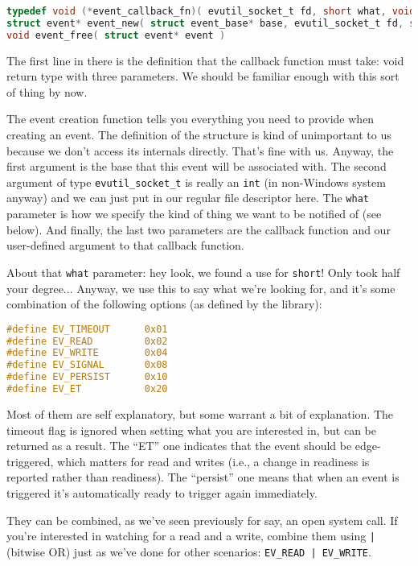 \begin{lstlisting}[language=C]
typedef void (*event_callback_fn)( evutil_socket_t fd, short what, void* arg )
struct event* event_new( struct event_base* base, evutil_socket_t fd, short what, event_callback_fn cb, void* arg )
void event_free( struct event* event )
\end{lstlisting}

The first line in there is the definition that the callback function must take: void return type with three parameters. We should be familiar enough with this sort of thing by now.

The event creation function tells you everything you need to provide when creating an event. The definition of the structure is kind of unimportant to us because we don't access its internals directly. That's fine with us. Anyway, the first argument is the base that this event will be associated with. The second argument of type \texttt{evutil\_socket\_t} is really an \texttt{int} (in non-Windows system anyway) and we can just put in our regular file descriptor here. The \texttt{what} parameter is how we specify the kind of thing we want to be notified of (see below). And finally, the last two parameters are the callback function and our user-defined argument to that callback function.

About that \texttt{what} parameter: hey look, we found a use for \texttt{short}! Only took half your degree... Anyway, we use this to say what we're looking for, and it's some combination of the following options (as defined by the library):

\begin{lstlisting}[language=C]
#define EV_TIMEOUT      0x01
#define EV_READ         0x02
#define EV_WRITE        0x04
#define EV_SIGNAL       0x08
#define EV_PERSIST      0x10
#define EV_ET           0x20
\end{lstlisting}

Most of them are self explanatory, but some warrant a bit of explanation. The timeout flag is ignored when setting what you are interested in, but can be returned as a result. The ``ET'' one indicates that the event should be edge-triggered, which matters for read and writes (i.e., a change in readiness is reported rather than readiness). The ``persist'' one means that when an event is triggered it's automatically ready to trigger again immediately.

They can be combined, as we've seen previously for say, an open system call. If you're interested in watching for a read and a write, combine them using \texttt{|} (bitwise OR) just as we've done for other scenarios: \texttt{EV\_READ | EV\_WRITE}.

